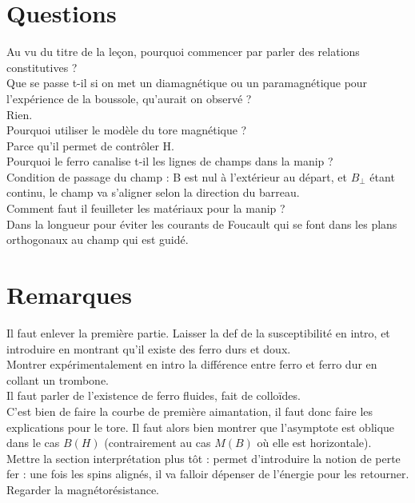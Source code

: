 \documentclass[12pt,prb,aps,epsf]{article}
\begin{document}
\section*{Questions}
Au vu du titre de la leçon, pourquoi commencer par parler des relations constitutives ? \\

Que se passe t-il si on met un diamagnétique ou un paramagnétique pour l'expérience de la boussole, qu'aurait on observé ?\\
Rien.\\

Pourquoi utiliser le modèle du tore magnétique ?\\
Parce qu'il permet de contrôler H. \\

Pourquoi le ferro canalise t-il les lignes de champs dans la manip ?\\
Condition de passage du champ : B est nul à l'extérieur au départ, et $B_{\perp}$ étant continu, le champ va s'aligner selon la direction du barreau.\\

Comment faut il feuilleter les matériaux pour la manip ?\\
Dans la longueur pour éviter les courants de Foucault qui se font dans les plans orthogonaux au champ qui est guidé.

\section*{Remarques}
Il faut enlever la première partie. Laisser la def de la susceptibilité en intro, et introduire en montrant qu'il existe des ferro durs et doux.\\
Montrer expérimentalement en intro la différence entre ferro et ferro dur en collant un trombone.\\
Il faut parler de l'existence de ferro fluides, fait de colloïdes.\\
C'est bien de faire la courbe de première aimantation, il faut donc faire les explications pour le tore. Il faut alors bien montrer que l'asymptote est oblique dans le cas $B(H)$ (contrairement au cas $M(B)$ où elle est horizontale).\\
Mettre la section interprétation plus tôt : permet d'introduire la notion de perte fer : une fois les spins alignés, il va falloir dépenser de l'énergie pour les retourner.\\
Regarder la magnétorésistance.
\end{document}
